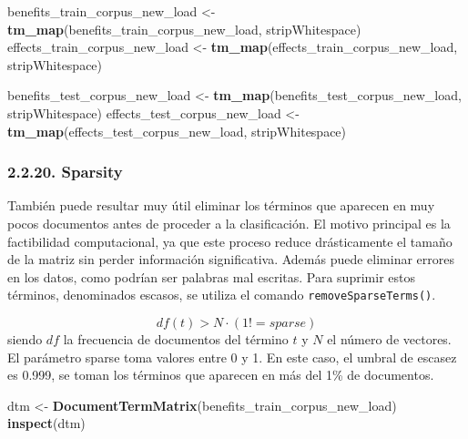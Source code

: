\documentclass[spanish,]{article}
\newenvironment{Shaded}{\begin{snugshade}}{\end{snugshade}}
\newcommand{\KeywordTok}[1]{\textcolor[rgb]{0.13,0.29,0.53}{\textbf{#1}}}
\newcommand{\StringTok}[1]{\textcolor[rgb]{0.31,0.60,0.02}{#1}}
\newcommand{\NormalTok}[1]{#1}
\begin{document}
\begin{Shaded}
\begin{Highlighting}[]
\NormalTok{benefits_train_corpus_new_load <-}\StringTok{ }\KeywordTok{tm_map}\NormalTok{(benefits_train_corpus_new_load, stripWhitespace) }
\NormalTok{effects_train_corpus_new_load <-}\StringTok{ }\KeywordTok{tm_map}\NormalTok{(effects_train_corpus_new_load, stripWhitespace) }

\NormalTok{benefits_test_corpus_new_load <-}\StringTok{ }\KeywordTok{tm_map}\NormalTok{(benefits_test_corpus_new_load, stripWhitespace) }
\NormalTok{effects_test_corpus_new_load <-}\StringTok{ }\KeywordTok{tm_map}\NormalTok{(effects_test_corpus_new_load, stripWhitespace) }
\end{Highlighting}
\end{Shaded}

\subsubsection{2.2.20. Sparsity}\label{sparsity}

También puede resultar muy útil eliminar los términos que aparecen en
muy pocos documentos antes de proceder a la clasificación. El motivo
principal es la factibilidad computacional, ya que este proceso reduce
drásticamente el tamaño de la matriz sin perder información
significativa. Además puede eliminar errores en los datos, como podrían
ser palabras mal escritas. Para suprimir estos términos, denominados
escasos, se utiliza el comando \texttt{removeSparseTerms()}.

\[ df(t) > N \cdot (1 != sparse)\] siendo \(df\) la frecuencia de
documentos del término \(t\) y \(N\) el número de vectores. El parámetro
sparse toma valores entre 0 y 1. En este caso, el umbral de escasez es
0.999, se toman los términos que aparecen en más del 1\% de documentos.

\begin{Shaded}
\begin{Highlighting}[]
\NormalTok{dtm <-}\StringTok{ }\KeywordTok{DocumentTermMatrix}\NormalTok{(benefits_train_corpus_new_load)}
\KeywordTok{inspect}\NormalTok{(dtm)}
\end{Highlighting}
\end{Shaded}
\end{document}

